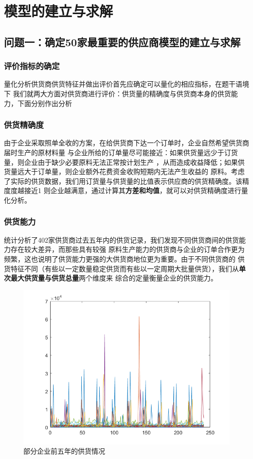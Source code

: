 \documentclass{cumcmthesis}
\begin{document}
\section{模型的建立与求解}
\subsection{问题一：确定50家最重要的供应商模型的建立与求解}

\subsubsection{评价指标的确定}
量化分析供货商供货特征并做出评价首先应确定可以量化的相应指标，在题干语境下
我们就两大方面对供货商进行评价：供货量的精确度与供货商本身的供货能力，下面分别作出分析
\subsubsection*{供货精确度}
由于企业采取照单全收的方案，在给供货商下达一个订单时，企业自然希望供货商届时生产的原材料量
与企业所给的订单量尽可能接近：如果供货量远少于订货量，则企业由于缺少必要原料无法正常按计划生产
，从而造成收益降低；如果供货量远大于订单量，则企业额外花费资金收购短期内无法产生收益的
原料。考虑了实际的供货数据，我们用订货量与供货量的比值表示供应商的供货精确度。该精度度越接近1
则企业越满意，通过计算其\textbf{方差和均值}，就可以对供货精确度进行量化分析。

\subsubsection*{供货能力}
统计分析了402家供货商过去五年内的供货记录，我们发现不同供货商间的供货能力存在较大差异，而那些具有较强
原料生产能力的供货商与企业的订单合作更为频繁，这也说明了供货能力更强的大供货商地位更为重要。由于不同供货商的
供货特征不同（有些以一定数量稳定供货而有些以一定周期大批量供货），我们从\textbf{单次最大供货量与供货总量}两个维度来
综合的定量衡量企业的供货能力。\par
\begin{figure}[htbp]
    \centering
    \includegraphics[scale=0.6]{offer.png}
    \caption{部分企业前五年的供货情况}     \label{fig:1}
    \end{figure}
\end{document}
